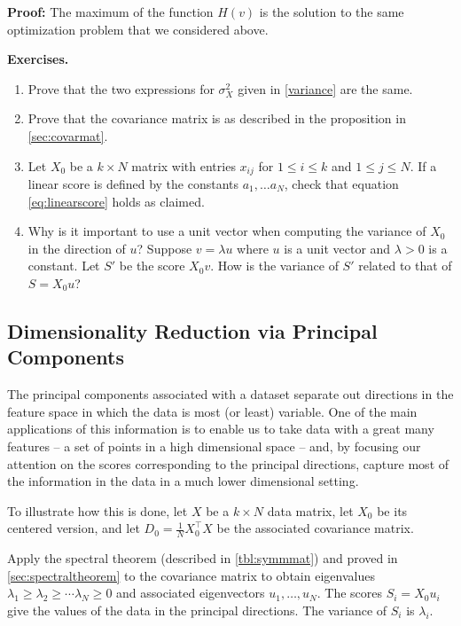 \documentclass[
]{article}
\begin{document}
\textbf{Proof:} The maximum of the function \(H(v)\) is the solution to
the same optimization problem that we considered above.

\textbf{Exercises.}

\begin{enumerate}
\def\labelenumi{\arabic{enumi}.}
\item
  Prove that the two expressions for \(\sigma_{X}^2\) given in
  \cref{variance} are the same.
\item
  Prove that the covariance matrix is as described in the proposition in
  \ref{sec:covarmat}.
\item
  Let \(X_{0}\) be a \(k\times N\) matrix with entries \(x_{ij}\) for
  \(1\le i\le k\) and \(1\le j\le N\). If a linear score is defined by
  the constants \(a_{1},\ldots a_{N}\), check that equation
  \cref{eq:linearscore} holds as claimed.
\item
  Why is it important to use a unit vector when computing the variance
  of \(X_{0}\) in the direction of \(u\)? Suppose \(v=\lambda u\) where
  \(u\) is a unit vector and \(\lambda>0\) is a constant. Let \(S'\) be
  the score \(X_{0}v\). How is the variance of \(S'\) related to that of
  \(S=X_{0}u\)?
\end{enumerate}

\hypertarget{dimensionality-reduction-via-principal-components}{%
\subsection{Dimensionality Reduction via Principal
Components}\label{dimensionality-reduction-via-principal-components}}

The principal components associated with a dataset separate out
directions in the feature space in which the data is most (or least)
variable. One of the main applications of this information is to enable
us to take data with a great many features -- a set of points in a high
dimensional space -- and, by focusing our attention on the scores
corresponding to the principal directions, capture most of the
information in the data in a much lower dimensional setting.

To illustrate how this is done, let \(X\) be a \(k\times N\) data
matrix, let \(X_{0}\) be its centered version, and let
\(D_{0} = \frac{1}{N}X_{0}^{\intercal}X\) be the associated covariance
matrix.

Apply the spectral theorem (described in \cref{tbl:symmmat}) and proved
in \cref{sec:spectraltheorem} to the covariance matrix to obtain
eigenvalues \(\lambda_{1}\ge \lambda_{2}\ge\cdots \lambda_{N}\ge 0\) and
associated eigenvectors \(u_{1},\ldots, u_{N}\). The scores
\(S_{i}=X_{0}u_{i}\) give the values of the data in the principal
directions. The variance of \(S_{i}\) is \(\lambda_{i}\).
\end{document}
